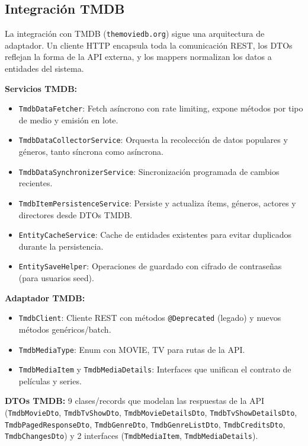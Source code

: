 \subsection{Integración TMDB}

La integración con TMDB (\texttt{themoviedb.org}) sigue una arquitectura de adaptador. Un cliente HTTP encapsula toda la comunicación REST, los DTOs reflejan la forma de la API externa, y los mappers normalizan los datos a entidades del sistema.

\textbf{Servicios TMDB:}
\begin{itemize}
  \item \texttt{TmdbDataFetcher}: Fetch asíncrono con rate limiting, expone métodos por tipo de medio y emisión en lote.
  \item \texttt{TmdbDataCollectorService}: Orquesta la recolección de datos populares y géneros, tanto síncrona como asíncrona.
  \item \texttt{TmdbDataSynchronizerService}: Sincronización programada de cambios recientes.
  \item \texttt{TmdbItemPersistenceService}: Persiste y actualiza ítems, géneros, actores y directores desde DTOs TMDB.
  \item \texttt{EntityCacheService}: Cache de entidades existentes para evitar duplicados durante la persistencia.
  \item \texttt{EntitySaveHelper}: Operaciones de guardado con cifrado de contraseñas (para usuarios seed).
\end{itemize}

\textbf{Adaptador TMDB:}
\begin{itemize}
  \item \texttt{TmdbClient}: Cliente REST con métodos \texttt{@Deprecated} (legado) y nuevos métodos genéricos/batch.
  \item \texttt{TmdbMediaType}: Enum con MOVIE, TV para rutas de la API.
  \item \texttt{TmdbMediaItem} y \texttt{TmdbMediaDetails}: Interfaces que unifican el contrato de películas y series.
\end{itemize}

\textbf{DTOs TMDB:} 9 clases/records que modelan las respuestas de la API (\texttt{TmdbMovieDto}, \texttt{TmdbTvShowDto}, \texttt{TmdbMovieDetailsDto}, \texttt{TmdbTvShowDetailsDto}, \texttt{TmdbPagedResponseDto}, \texttt{TmdbGenreDto}, \texttt{TmdbGenreListDto}, \texttt{TmdbCreditsDto}, \texttt{TmdbChangesDto}) y 2 interfaces (\texttt{TmdbMediaItem}, \texttt{TmdbMediaDetails}).

